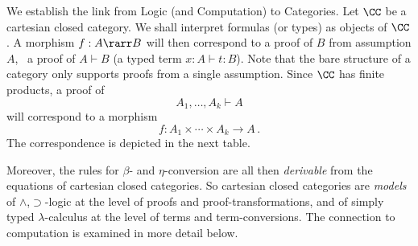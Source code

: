 \documentclass{svmult}
\begin{document}
We establish the link from Logic (and Computation) to Categories. Let $\CC$ be a cartesian closed category. We shall interpret formulas (or types) as
objects of $\CC$. A morphism $f:A\rarr B$ will then correspond to a proof of $B$ from assumption $A$, {\ie}~a proof of $A\vdash B$ (a typed term
$x:A\vdash t:B$).
%
Note that the bare structure of a category only supports proofs from a single assumption. Since $\CC$ has finite products, a proof of
\[ A_1 , \ldots , A_k \vdash A \]
will correspond to a morphism
\[ f : A_1 \times \cdots \times A_k \longrightarrow A\,. \]
%
The correspondence is depicted in the next table.
\begin{center}
\renewcommand{\arraystretch}{0.5}
\end{center}
%
Moreover, the rules for $\beta$- and $\eta$-conversion are all then \emph{derivable} from the equations of cartesian closed categories. So cartesian
closed categories are \emph{models} of $\wedge$,$\supset$-logic at the level of proofs and proof-transformations, and of simply typed
$\lambda$-calculus at the level of terms and term-conversions.
%
The connection to computation is examined in more detail below.
\end{document}
